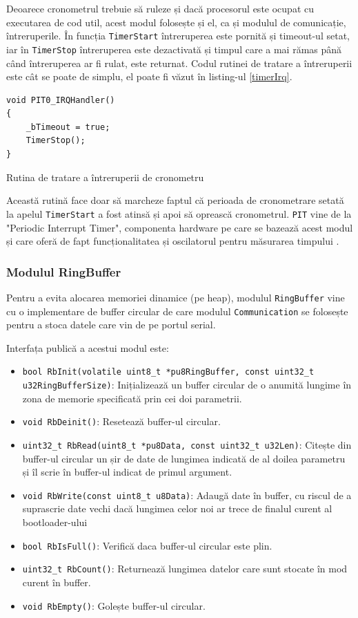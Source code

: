 \documentclass[12pt,a4paper,titlepage]{report}
\begin{document}
Deoarece cronometrul trebuie să ruleze și dacă procesorul este ocupat cu executarea de cod util, acest modul folosește și el, ca și modulul de comunicație, întreruperile. În funcția \texttt{TimerStart} întreruperea este pornită și timeout-ul setat, iar în \texttt{TimerStop} întreruperea este dezactivată și timpul care a mai rămas până când întreruperea ar fi rulat, este returnat. Codul rutinei de tratare a întreruperii este cât se poate de simplu, el poate fi văzut în listing-ul \ref{timerIrq}.

\begin{listing}[h]
\begin{verbatim}
void PIT0_IRQHandler()
{
    _bTimeout = true;
    TimerStop();
}
\end{verbatim}

\caption{Rutina de tratare a întreruperii de cronometru}
\label{timerIrq}
\end{listing}

Această rutină face doar să marcheze faptul că perioada de cronometrare setată la apelul \texttt{TimerStart} a fost atinsă și apoi să oprească cronometrul. \texttt{PIT} vine de la "Periodic Interrupt Timer", componenta hardware pe care se bazează acest modul și care oferă de fapt funcționalitatea și oscilatorul pentru măsurarea timpului \cite{kv5x}.

\subsubsection{Modulul RingBuffer}

Pentru a evita alocarea memoriei dinamice (pe heap), modulul \texttt{RingBuffer} vine cu o implementare de buffer circular de care modulul \texttt{Communication} se folosește pentru a stoca datele care vin de pe portul serial.

Interfața publică a acestui modul este:
\begin{itemize}
\item \texttt{bool RbInit(volatile uint8\_t *pu8RingBuffer, const uint32\_t u32RingBufferSize)}: Inițializează un buffer circular de o anumită lungime în zona de memorie specificată prin cei doi parametrii.
\item \texttt{void RbDeinit()}: Resetează buffer-ul circular.
\item \texttt{uint32\_t RbRead(uint8\_t *pu8Data, const uint32\_t u32Len)}: Citește din buffer-ul circular un șir de date de lungimea indicată de al doilea parametru și îl scrie în buffer-ul indicat de primul argument.
\item \texttt{void RbWrite(const uint8\_t u8Data)}: Adaugă date în buffer, cu riscul de a suprascrie date vechi dacă lungimea celor noi ar trece de finalul curent al bootloader-ului
\item \texttt{bool RbIsFull()}: Verifică daca buffer-ul circular este plin.
\item \texttt{uint32\_t RbCount()}: Returnează lungimea datelor care sunt stocate în mod curent în buffer.
\item \texttt{void RbEmpty()}: Golește buffer-ul circular.
\end{itemize}
\end{document}
